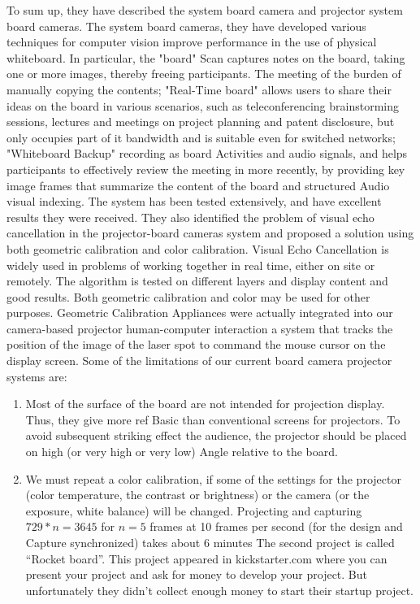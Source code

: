 To sum up, they have described the system board camera and projector system board cameras. The system board cameras, they have developed various techniques for computer vision improve performance in the use of physical whiteboard. In particular, the "board" Scan captures notes on the board, taking one or more images, thereby freeing participants. The meeting of the burden of manually copying the contents; "Real-Time board" allows users to share their ideas on the board in various scenarios, such as teleconferencing brainstorming sessions, lectures and meetings on project planning and patent disclosure, but only occupies part of it bandwidth and is suitable even for switched networks; "Whiteboard Backup" recording as board Activities and audio signals, and helps participants to effectively review the meeting in more recently, by providing key image frames that summarize the content of the board and structured Audio visual indexing. The system has been tested extensively, and have excellent results they were received.
They also identified the problem of visual echo cancellation in the projector-board cameras system and proposed a solution using both geometric calibration and color calibration. Visual Echo Cancellation is widely used in problems of working together in real time, either on site or remotely. The algorithm is tested on different layers and display content and good results. Both geometric calibration and color may be used for other purposes. Geometric Calibration Appliances were actually integrated into our camera-based projector human-computer interaction a system that tracks the position of the image of the laser spot to command the mouse cursor on the display screen. Some of the limitations of our current board camera projector systems are: 

\begin{enumerate}
\item Most of the surface of the board are not intended for projection display. Thus, they give more ref Basic than conventional screens for projectors. To avoid subsequent striking effect the audience, the projector should be placed on high (or very high or very low) Angle relative to the board.
\item We must repeat a color calibration, if some of the settings for the projector (color temperature, the contrast or brightness) or the camera (or the exposure, white balance) will be changed. Projecting and capturing $729 * n = 3645$ for $n = 5$ frames at 10 frames per second (for the design and Capture synchronized) takes about 6 minutes The second project is called “Rocket board”. This project appeared in kickstarter.com where you can present your project and ask for money to develop your project. But unfortunately they didn’t collect enough money to start their startup project.
\end{enumerate}